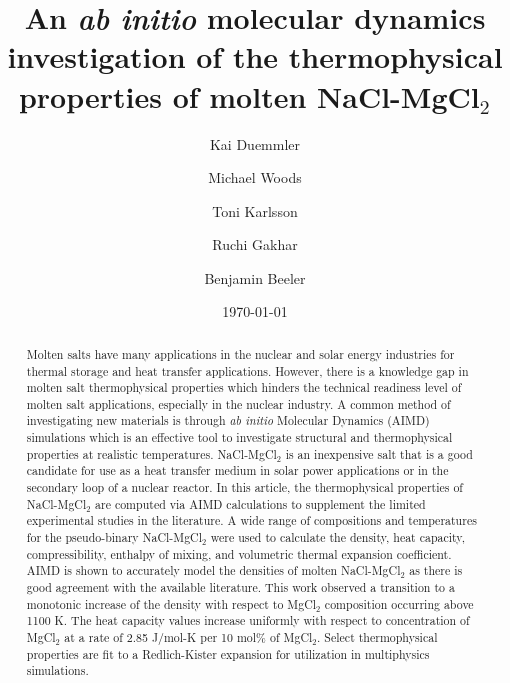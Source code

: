 \documentclass[review]{elsarticle}
\begin{document}
\begin{frontmatter}

\title{An \textit{ab initio} molecular dynamics investigation of the thermophysical properties of molten NaCl-MgCl$_2$ }

\author[ncsu]{Kai Duemmler}
\author[inl]{Michael Woods}
\author[inl]{Toni Karlsson}
\author[inl]{Ruchi Gakhar}
\author[ncsu,inl]{Benjamin Beeler}

\address[ncsu]{North Carolina State University, Raleigh, NC 27695}
\address[inl]{Idaho National Laboratory, Idaho Falls, ID 83415}
\date{\today}

\begin{abstract}
Molten salts have many applications in the nuclear and solar energy industries for thermal storage and heat transfer applications. However, there is a knowledge gap in molten salt thermophysical properties which hinders the technical readiness level of molten salt applications, especially in the nuclear industry. A common method of investigating new materials is through \textit{ab initio} Molecular Dynamics (AIMD) simulations which is an effective tool to investigate structural and thermophysical properties at realistic temperatures. NaCl-MgCl$_2$ is an inexpensive salt that is a good candidate for use as a heat transfer medium in solar power applications or in the secondary loop of a nuclear reactor. In this article, the thermophysical properties of NaCl-MgCl$_2$ are computed via AIMD calculations to supplement the limited experimental studies in the literature. A wide range of compositions and temperatures for the pseudo-binary NaCl-MgCl$_2$ were used to calculate the density, heat capacity, compressibility, enthalpy of mixing, and volumetric thermal expansion coefficient. AIMD is shown to accurately model the densities of molten NaCl-MgCl$_2$ as there is good agreement with the available literature. This work observed a transition to a monotonic increase of the density with respect to MgCl$_2$ composition occurring above 1100 K. The heat capacity values increase uniformly with respect to concentration of MgCl$_2$ at a rate of 2.85 J/mol-K per 10 mol\% of MgCl$_2$. Select thermophysical properties are fit to a Redlich-Kister expansion for utilization in multiphysics simulations. 
\end{abstract}

\end{frontmatter}
\end{document}
